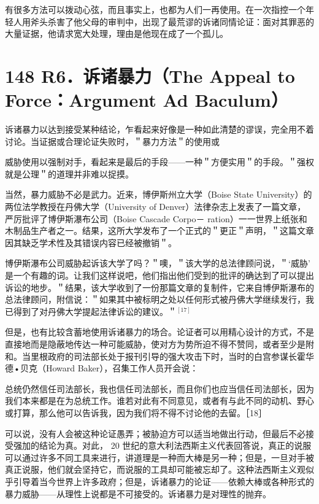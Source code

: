 有很多方法可以拨动心弦，而且事实上，也都为人们一再使用。在一次指控一个年轻人用斧头杀害了他父母的审判中，出现了最荒谬的诉诸同情论证：面对其罪恶的大量证据，他请求宽大处理，理由是他现在成了一个孤儿。

\section*{148 R6．诉诸暴力（The Appeal to Force：Argument Ad Baculum）}
诉诸暴力以达到接受某种结论，乍看起来好像是一种如此清楚的谬误，完全用不着讨论。当证据或合理论证失败时，＂暴力方法＂的使用或

威胁使用以强制对手，看起来是最后的手段——一种＂方便实用＂的手段。＂强权就是公理＂的道理并非难以捉摸。

当然，暴力威胁不必是武力。近来，博伊斯州立大学（Boise State University）的两位法学教授在丹佛大学（University of Denver）法律杂志上发表了一篇文章，严厉批评了博伊斯瀑布公司（Boise Cascade Corpo－ ration）一一世界上纸张和木制品生产者之一。结果，这所大学发布了一个正式的＂更正＂声明，＂这篇文章因其缺乏学术性及其错误内容已经被撤销＂。

博伊斯瀑布公司威胁起诉该大学了吗？＂噢，＂该大学的总法律顾问说，＂‘威胁’ 是一个有趣的词。让我们这样说吧，他们指出他们受到的批评的确达到了可以提出诉讼的地步。＂结果，该大学收到了一份那篇文章的复制件，它来自博伊斯瀑布的总法律顾问，附信说：＂如果其中被标明之处以任何形式被丹佛大学继续发行，我已得到了对丹佛大学提起法律诉讼的建议。＂${ }^{[17]}$

但是，也有比较含蓄地使用诉诸暴力的场合。论证者可以用精心设计的方式，不是直接地而是隐蔽地传达一种可能威胁，使对方为势所迫不得不赞同，或者至少是附和。当里根政府的司法部长处于报刊引导的强大攻击下时，当时的白宫参谋长霍华德•贝克（Howard Baker），召集工作人员开会说：

\begin{displayquote}
总统仍然信任司法部长，我也信任司法部长，而且你们也应当信任司法部长，因为我们本来都是在为总统工作。谁若对此有不同意见，或者有与此不同的动机、野心或打算，那么他可以告诉我，因为我们将不得不讨论他的去留。［18］
\end{displayquote}

可以说，没有人会被这种论证愚弄；被胁迫方可以适当地做出行动，但最后不必接受强加的结论为真。对此， 20 世纪的意大利法西斯主义代表回答说，真正的说服可以通过许多不同工具来进行，讲道理是一种而大棒是另一种；但是，一旦对手被真正说服，他们就会坚持它，而说服的工具却可能被忘却了。这种法西斯主义观似乎引导着当今世界上许多政府；但是，诉诸暴力的论证——依赖大棒或各种形式的暴力威胁——从理性上说都是不可接受的。诉诸暴力是对理性的抛弃。

